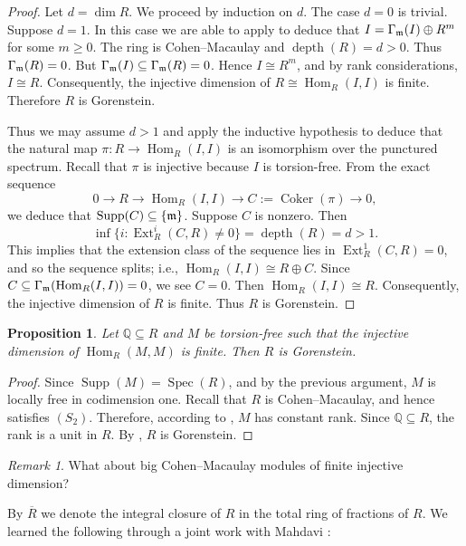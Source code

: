 \documentclass[10. pt,a4paper]{amsart}
\newtheorem{proposition}[theorem]{Proposition}
\theoremstyle{definition}
\theoremstyle{remark}
\newtheorem{remark}[theorem]{Remark}\newtheorem{fact}[theorem]{Fact}
\newcommand{\Spec}{\operatorname{Spec}}
\newcommand{\Ext}{\operatorname{Ext}}
\newcommand{\Supp}{\operatorname{Supp}}
\newcommand{\Hom}{\operatorname{Hom}}
\newcommand{\depth}{\operatorname{depth}}
\newcommand{\fm}{\frak{m}}
\begin{document}
\begin{proof}
	Let $d = \dim R$. We proceed by induction on $d$. The case $d = 0$ is trivial. Suppose $d = 1$. In this case we are able to apply \cite[2.3]{q1} to deduce that $I = \Gamma_{\fm}(I) \oplus R^m$ for some $m \geq 0$. The ring is Cohen--Macaulay and $\depth(R) = d > 0$. Thus $\Gamma_{\fm}(R) = 0$. But $\Gamma_{\fm}(I) \subseteq \Gamma_{\fm}(R) = 0$. Hence $I \cong R^m$, and by rank considerations, $I \cong R$. Consequently, the injective dimension of $R \cong \Hom_R(I, I)$ is finite. Therefore $R$ is Gorenstein.
	
	Thus we may assume $d > 1$ and apply the inductive hypothesis to deduce that the natural map $\pi : R \to \Hom_R(I, I)$ is an isomorphism over the punctured spectrum. Recall that $\pi$ is injective because $I$ is torsion-free. From the exact sequence
	\[
	0 \longrightarrow R \longrightarrow \Hom_R(I, I) \longrightarrow C := \operatorname{Coker}(\pi) \longrightarrow 0,
	\]
	we deduce that $\Supp(C) \subseteq \{\fm\}$. Suppose $C$ is nonzero. Then
	\[
	\inf\{i : \Ext^i_R(C, R) \neq 0\} = \depth(R) = d > 1.
	\]
	This implies that the extension class of the sequence lies in $\Ext^1_R(C, R) = 0$, and so the sequence splits; i.e., $\Hom_R(I, I) \cong R \oplus C$. Since $C \subseteq \Gamma_{\fm}(\Hom_R(I, I)) = 0$, we see $C = 0$. Then $\Hom_R(I, I) \cong R$. Consequently, the injective dimension of $R$ is finite. Thus $R$ is Gorenstein.
\end{proof}

\begin{proposition}
	Let $\mathbb{Q} \subseteq R$ and $M$ be torsion-free such that the injective dimension of $\Hom_R(M, M)$ is finite. Then $R$ is Gorenstein.
\end{proposition}

\begin{proof}
	Since $\Supp(M) = \Spec(R)$, and by the previous argument, $M$ is locally free in codimension one. Recall that $R$ is Cohen--Macaulay, and hence satisfies $(S_2)$. Therefore, according to \cite[5.5]{Ki}, $M$ has constant rank. Since $\mathbb{Q} \subseteq R$, the rank is a unit in $R$. By \cite[3.1]{q1}, $R$ is Gorenstein.
\end{proof}

\begin{remark}
	What about big Cohen--Macaulay modules of finite injective dimension?
\end{remark}

By $\overline{R}$ we denote the integral closure of $R$ in the total ring of fractions of $R$. We learned the following through a joint work with Mahdavi \cite[6.15]{Elham}:
\end{document}
